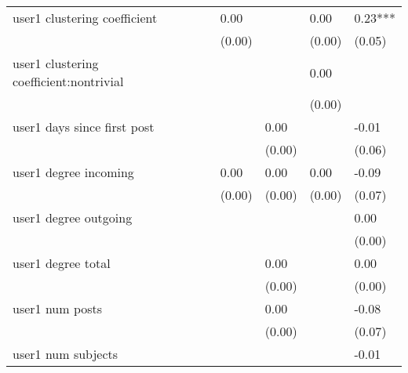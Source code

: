 \begin{table*}
\begin{center}
\begin{tabular}{llllllll}
user1 clustering coefficient                   &          &            &         & 0.00    &          & 0.00               & 0.23***  \\
                                               &          &            &         & (0.00)  &          & (0.00)             & (0.05)   \\
user1 clustering coefficient:nontrivial        &          &            &         &         &          & 0.00               &          \\
                                               &          &            &         &         &          & (0.00)             &          \\
user1 days since first post                    &          &            &         &         & 0.00     &                    & -0.01    \\
                                               &          &            &         &         & (0.00)   &                    & (0.06)   \\
user1 degree incoming                          &          &            &         & 0.00    & 0.00     & 0.00               & -0.09    \\
                                               &          &            &         & (0.00)  & (0.00)   & (0.00)             & (0.07)   \\
user1 degree outgoing                          &          &            &         &         &          &                    & 0.00     \\
                                               &          &            &         &         &          &                    & (0.00)   \\
user1 degree total                             &          &            &         &         & 0.00     &                    & 0.00     \\
                                               &          &            &         &         & (0.00)   &                    & (0.00)   \\
user1 num posts                                &          &            &         &         & 0.00     &                    & -0.08    \\
                                               &          &            &         &         & (0.00)   &                    & (0.07)   \\
user1 num subjects                             &          &            &         &         &          &                    & -0.01    \\

\end{tabular}
\end{center}
\end{table*}
